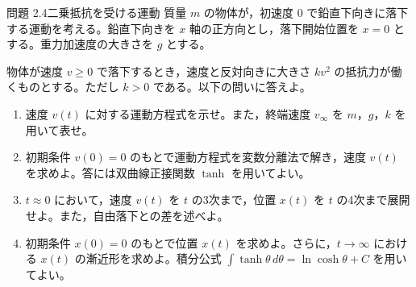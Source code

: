 \problemstart
{}

\begin{problemBox}{問題 2.4\quad 二乗抵抗を受ける運動\hspace{1.2em}{\small\mdseries 〔標準〕}}
質量 $m$ の物体が，初速度 0 で鉛直下向きに落下する運動を考える。鉛直下向きを $x$ 軸の正方向とし，落下開始位置を $x=0$ とする。重力加速度の大きさを $g$ とする。
\par
物体が速度 $v\geq0$ で落下するとき，速度と反対向きに大きさ $kv^2$ の抵抗力が働くものとする。ただし $k>0$ である。以下の問いに答えよ。

\begin{enumerate}
  \item 速度 $v(t)$ に対する運動方程式を示せ。また，終端速度 $v_{\infty}$ を $m$，$g$，$k$ を用いて表せ。

  \item 初期条件 $v(0)=0$ のもとで運動方程式を変数分離法で解き，速度 $v(t)$ を求めよ。答には双曲線正接関数 $\tanh$ を用いてよい。

  \item $t\approx0$ において，速度 $v(t)$ を $t$ の3次まで，位置 $x(t)$ を $t$ の4次まで展開せよ。また，自由落下との差を述べよ。

  \item 初期条件 $x(0)=0$ のもとで位置 $x(t)$ を求めよ。さらに，$t\to\infty$ における $x(t)$ の漸近形を求めよ。積分公式 $\int \tanh\theta\,d\theta=\ln\cosh\theta+C$ を用いてよい。
\end{enumerate}
\end{problemBox}

